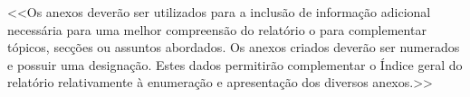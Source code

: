 \documentclass[a4paper,12pt]{scrreprt}
\begin{document}


\renewcommand{\nomname}{Lista de Siglas e Acrónimos}

\renewcommand{\nompreamble}{<<Apresentar uma lista com todas as siglas e acrónimos utilizados durante a realização do trabalho. O formato base para esta lista deverá ser da forma como abaixo se apresenta.>>}


\printnomenclature







    <<Os anexos deverão ser utilizados para a inclusão de informação adicional necessária para uma melhor compreensão do relatório o para complementar tópicos, secções ou assuntos abordados. Os anexos criados deverão ser numerados e possuir uma designação. Estes dados permitirão complementar o Índice geral do relatório relativamente à enumeração e apresentação dos diversos anexos.>>
    


\end{document}
